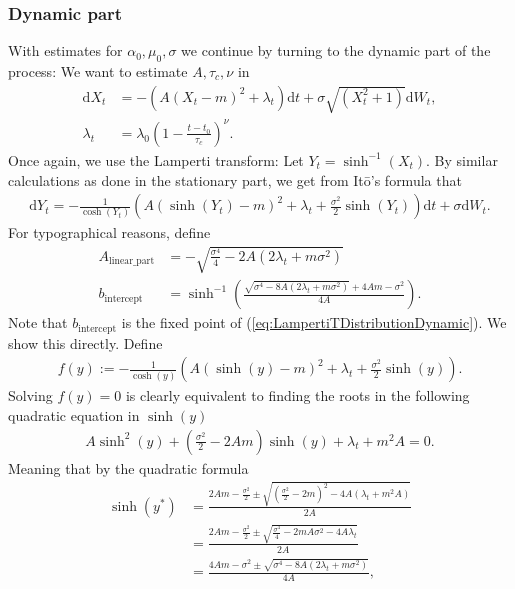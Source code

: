 \subsubsection{Dynamic part}
With estimates for $\alpha_0, \mu_0, \sigma$ we continue by turning to the dynamic part of the process: We want to estimate $A, \tau_c, \nu$ in
\begin{align}
    \mathrm{d}X_t &= -\left(A(X_t - m)^2 + \lambda_t\right)\mathrm{d}t + \sigma \sqrt{\left(X_t^2 + 1\right)}\mathrm{d}W_t,\\
    \lambda_t &= \lambda_0 \left(1 - \frac{t - t_0}{\tau_c}\right)^\nu.
\end{align}
Once again, we use the Lamperti transform: Let $Y_t = \sinh^{-1}(X_t)$. By similar calculations as done in the stationary part, we get from Itō's formula that
\begin{align}
    \mathrm{d}Y_t = -\frac{1}{\cosh(Y_t)}\left(A\left(\sinh(Y_t) - m\right)^2 + \lambda_t + \frac{\sigma^2}{2}\sinh(Y_t)\right)\mathrm{d}t + \sigma \mathrm{d}W_t. \label{eq:LampertiTDistributionDynamic}
\end{align}
For typographical reasons, define
\begin{align}
    A_{\textrm{linear\_part}} &= -\sqrt{\frac{\sigma^4}{4} - 2A\left(2\lambda_t + m\sigma^2\right)}\\
    b_{\textrm{intercept}} &= \sinh^{-1}\left(\frac{\sqrt{\sigma^4 - 8A\left(2\lambda_t + m \sigma^2\right)} + 4 Am - \sigma^2}{4A}\right).
\end{align}
Note that $b_{\textrm{intercept}}$ is the fixed point of (\ref{eq:LampertiTDistributionDynamic}). We show this directly. Define
\begin{align}
    f(y) := -\frac{1}{\cosh(y)}\left(A\left(\sinh(y) - m\right)^2 + \lambda_t + \frac{\sigma^2}{2}\sinh(y)\right).
\end{align}
Solving $f(y) = 0$ is clearly equivalent to finding the roots in the following quadratic equation in $\sinh(y)$
\begin{align}
    A\sinh^2(y) + \left(\frac{\sigma^2}{2} - 2Am\right)\sinh(y) + \lambda_t + m^2A = 0.
\end{align}
Meaning that by the quadratic formula
\begin{align}
    \sinh(y^*) &= \frac{2Am-\frac{\sigma^2}{2}\pm\sqrt{\left(\frac{\sigma^2}{2} - 2m\right)^2 - 4A\left(\lambda_t + m^2 A\right)}}{2A}\nonumber\\
    &= \frac{2Am-\frac{\sigma^2}{2}\pm\sqrt{\frac{\sigma^4}{4}-2mA\sigma^2 - 4A\lambda_t}}{2A}\nonumber\\
    &= \frac{4Am-\sigma^2\pm\sqrt{\sigma^4-8A\left(2\lambda_t + m\sigma^2\right)}}{4A},
\end{align}
